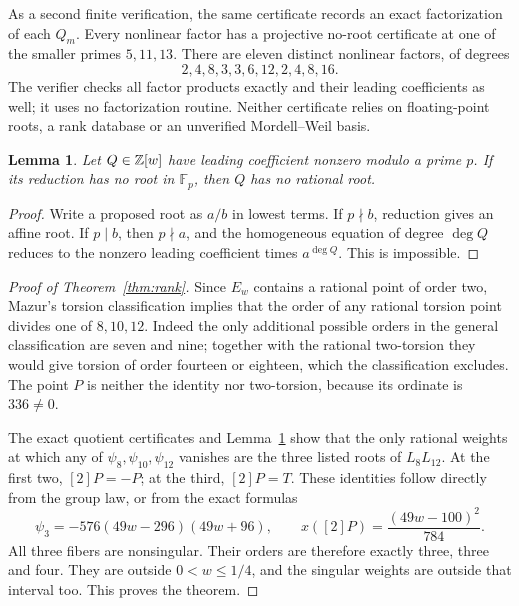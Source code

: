 \documentclass[11pt,a4paper]{article}
\newtheorem{lemma}[theorem]{Lemma}
\begin{document}
As a second finite verification, the same certificate records an exact
factorization of each \(Q_m\). Every nonlinear factor has a projective
no-root certificate at one of the smaller primes \(5,11,13\).
There are eleven distinct nonlinear factors, of degrees
\[
                 2,4,8,3,3,6,12,2,4,8,16.
\]
The verifier checks all factor products exactly and their leading
coefficients as well; it uses no factorization routine. Neither
certificate relies on floating-point roots, a rank database or an
unverified Mordell--Weil basis.

\begin{lemma}\label{lem:projective}
Let \(Q\in\mathbb Z[w]\) have leading coefficient nonzero modulo a prime
\(p\). If its reduction has no root in \(\mathbb F_p\), then
\(Q\) has no rational root.
\end{lemma}
\begin{proof}
Write a proposed root as \(a/b\) in lowest terms. If \(p\nmid b\),
reduction gives an affine root. If \(p\mid b\), then \(p\nmid a\),
and the homogeneous equation of degree \(\deg Q\) reduces to the
nonzero leading coefficient times \(a^{\deg Q}\). This is impossible.
\end{proof}

\begin{proof}[Proof of Theorem~\ref{thm:rank}]
Since \(E_w\) contains a rational point of order two, Mazur's torsion
classification \cite[Theorem 4.1]{Mazur} implies that the order of any
rational torsion point divides one of \(8,10,12\). Indeed the only
additional possible orders in the general classification are seven
and nine; together with the rational two-torsion they would give
torsion of order fourteen or eighteen, which the classification excludes.
The point \(P\) is neither the identity nor two-torsion, because its
ordinate is \(336\ne0\).

The exact quotient certificates and Lemma~\ref{lem:projective} show
that the only rational weights at which any of
\(\psi_8,\psi_{10},\psi_{12}\) vanishes are the three listed roots
of \(L_8L_{12}\). At the first two, \([2]P=-P\); at the third,
\([2]P=T\). These identities follow directly from the group law,
or from the exact formulas
\[
 \psi_3=-576(49w-296)(49w+96),\qquad
                         x([2]P)=\frac{(49w-100)^2}{784}.
\]
All three fibers are nonsingular. Their orders are therefore exactly
three, three and four. They are outside \(0<w\le1/4\), and the
singular weights are outside that interval too. This proves the theorem.
\end{proof}
\end{document}
